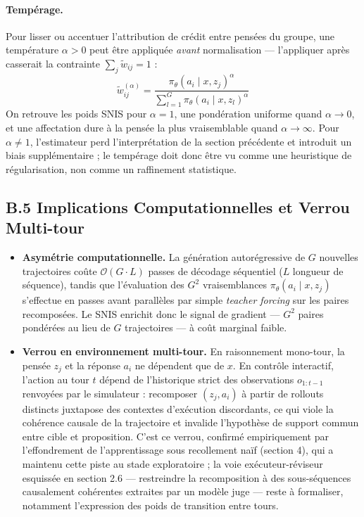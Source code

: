\documentclass[11pt,a4paper]{article}
\begin{document}
\paragraph{Tempérage.} Pour lisser ou accentuer l'attribution de crédit entre pensées du groupe, une température $\alpha > 0$ peut être appliquée \emph{avant} normalisation — l'appliquer après casserait la contrainte $\sum_j \tilde{w}_{ij} = 1$ :
\begin{equation}
\tilde{w}_{ij}^{(\alpha)} = \frac{\pi_\theta(a_i \mid x, z_j)^\alpha}{\sum_{l=1}^G \pi_\theta(a_i \mid x, z_l)^\alpha}
\end{equation}
On retrouve les poids SNIS pour $\alpha = 1$, une pondération uniforme quand $\alpha \to 0$, et une affectation dure à la pensée la plus vraisemblable quand $\alpha \to \infty$. Pour $\alpha \neq 1$, l'estimateur perd l'interprétation de la section précédente et introduit un biais supplémentaire ; le tempérage doit donc être vu comme une heuristique de régularisation, non comme un raffinement statistique.

\subsection*{B.5 Implications Computationnelles et Verrou Multi-tour}
\begin{itemize}
    \item \textbf{Asymétrie computationnelle.} La génération autorégressive de $G$ nouvelles trajectoires coûte $\mathcal{O}(G \cdot L)$ passes de décodage séquentiel ($L$ longueur de séquence), tandis que l'évaluation des $G^2$ vraisemblances $\pi_\theta(a_i \mid x, z_j)$ s'effectue en passes avant parallèles par simple \emph{teacher forcing} sur les paires recomposées. Le SNIS enrichit donc le signal de gradient — $G^2$ paires pondérées au lieu de $G$ trajectoires — à coût marginal faible.
    \item \textbf{Verrou en environnement multi-tour.} En raisonnement mono-tour, la pensée $z_j$ et la réponse $a_i$ ne dépendent que de $x$. En contrôle interactif, l'action au tour $t$ dépend de l'historique strict des observations $o_{1:t-1}$ renvoyées par le simulateur : recomposer $(z_j, a_i)$ à partir de rollouts distincts juxtapose des contextes d'exécution discordants, ce qui viole la cohérence causale de la trajectoire et invalide l'hypothèse de support commun entre cible et proposition. C'est ce verrou, confirmé empiriquement par l'effondrement de l'apprentissage sous recollement naïf (section 4), qui a maintenu cette piste au stade exploratoire ; la voie exécuteur-réviseur esquissée en section 2.6 — restreindre la recomposition à des sous-séquences causalement cohérentes extraites par un modèle juge — reste à formaliser, notamment l'expression des poids de transition entre tours.
\end{itemize}
\end{document}

